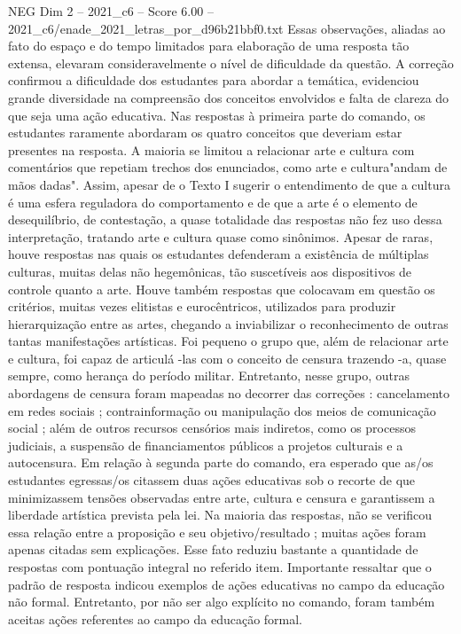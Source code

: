 \begin{textsample}{NEG Dim 2 – 2021\_c6 – Score 6.00 – 2021\_c6/enade\_2021\_letras\_por\_d96b21bbf0.txt}
Essas observações, aliadas ao fato do espaço e do tempo limitados para elaboração de uma resposta tão extensa, elevaram consideravelmente o nível de dificuldade da questão.
A correção confirmou a dificuldade dos estudantes para abordar a temática, evidenciou grande diversidade na compreensão dos conceitos envolvidos e falta de clareza do que seja uma ação educativa.
Nas respostas à primeira parte do comando, os estudantes raramente abordaram os quatro conceitos que deveriam estar presentes na resposta.
A maioria se limitou a relacionar arte e cultura com comentários que repetiam trechos dos enunciados, como arte e cultura"andam de mãos dadas".
Assim, apesar de o Texto I sugerir o entendimento de que a cultura é uma esfera reguladora do comportamento e de que a arte é o elemento de desequilíbrio, de contestação, a quase totalidade das respostas não fez uso dessa interpretação, tratando arte e cultura quase como sinônimos.
Apesar de raras, houve respostas nas quais os estudantes defenderam a existência de múltiplas culturas, muitas delas não hegemônicas, tão suscetíveis aos dispositivos de controle quanto a arte.
Houve também respostas que colocavam em questão os critérios, muitas vezes elitistas e eurocêntricos, utilizados para produzir hierarquização entre as artes, chegando a inviabilizar o reconhecimento de outras tantas manifestações artísticas.
Foi pequeno o grupo que, além de relacionar arte e cultura, foi capaz de articulá -las com o conceito de censura trazendo -a, quase sempre, como herança do período militar.
Entretanto, nesse grupo, outras abordagens de censura foram mapeadas no decorrer das correções : cancelamento em redes sociais ; contrainformação ou manipulação dos meios de comunicação social ; além de outros recursos censórios mais indiretos, como os processos judiciais, a suspensão de financiamentos públicos a projetos culturais e a autocensura.
Em relação à segunda parte do comando, era esperado que as/os estudantes egressas/os citassem duas ações educativas sob o recorte de que minimizassem tensões observadas entre arte, cultura e censura e garantissem a liberdade artística prevista pela lei.
Na maioria das respostas, não se verificou essa relação entre a proposição e seu objetivo/resultado ; muitas ações foram apenas citadas sem explicações.
Esse fato reduziu bastante a quantidade de respostas com pontuação integral no referido item.
Importante ressaltar que o padrão de resposta indicou exemplos de ações educativas no campo da educação não formal.
Entretanto, por não ser algo explícito no comando, foram também aceitas ações referentes ao campo da educação formal.

\end{textsample}
